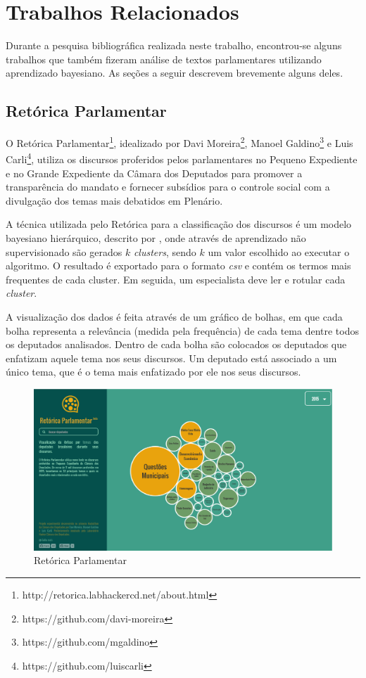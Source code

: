 \section{Trabalhos Relacionados}

Durante a pesquisa bibliográfica realizada neste trabalho, encontrou-se alguns trabalhos que também fizeram análise de textos parlamentares utilizando aprendizado bayesiano. As seções a seguir descrevem brevemente alguns deles.

\subsection{Retórica Parlamentar}

O Retórica Parlamentar\footnote{http://retorica.labhackercd.net/about.html}, idealizado por Davi Moreira\footnote{https://github.com/davi-moreira}, Manoel Galdino\footnote{https://github.com/mgaldino} e Luis Carli\footnote{https://github.com/luiscarli}, utiliza os discursos proferidos pelos parlamentares no Pequeno Expediente e no Grande Expediente da Câmara dos Deputados para promover a transparência do mandato e fornecer subsídios para o controle social com a divulgação dos temas mais debatidos em Plenário.

A técnica utilizada pelo Retórica para a classificação dos discursos é um modelo bayesiano hierárquico, descrito por , onde através de aprendizado não supervisionado são gerados \(k\) \textit{clusters}, sendo \(k\) um valor escolhido ao executar o algoritmo. O resultado é exportado para o formato \textit{csv} e contém os termos mais frequentes de cada cluster. Em seguida, um especialista deve ler e rotular cada \textit{cluster}.

A visualização dos dados é feita através de um gráfico de bolhas, em que cada bolha representa a relevância (medida pela frequência) de cada tema dentre todos os deputados analisados. Dentro de cada bolha são colocados os deputados que enfatizam aquele tema nos seus discursos. Um deputado está associado a um único tema, que é o tema mais enfatizado por ele nos seus discursos.

\begin{figure}[h]
    \centering
    \includegraphics[scale=0.3]{figuras/retorica.eps}
    \caption{Retórica Parlamentar}
\end{figure}


